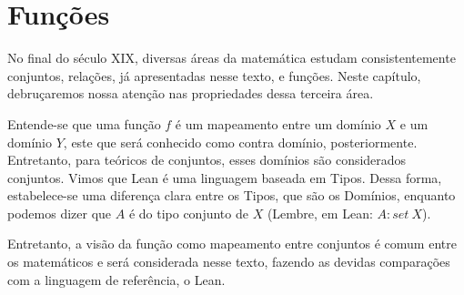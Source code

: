 \chapter{Funções}

No final do século XIX, diversas áreas da matemática 
estudam consistentemente conjuntos, relações, já apresentadas
nesse texto, e funções. Neste capítulo, debruçaremos nossa 
atenção nas propriedades dessa terceira área. 

Entende-se que uma função $f$ é um mapeamento entre um 
domínio $X$ e um domínio $Y$, este que será conhecido como 
contra domínio, posteriormente. Entretanto, para teóricos 
de conjuntos, esses domínios são considerados conjuntos. 
Vimos que Lean é uma linguagem baseada em Tipos. Dessa forma, 
estabelece-se uma diferença clara entre os Tipos, que são
os Domínios, enquanto podemos dizer que $A$ é do tipo conjunto
de $X$ (Lembre, em Lean: $A : set~ X$). 

Entretanto, a visão da função como mapeamento entre conjuntos
é comum entre os matemáticos e será considerada nesse texto,
fazendo as devidas comparações com a linguagem de referência, 
o Lean. 


